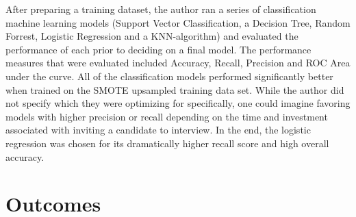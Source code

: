 After preparing a training dataset, the author ran a series of classification machine learning models (Support Vector Classification, a Decision Tree, Random Forrest, Logistic Regression and a KNN-algorithm) and evaluated the performance of each prior to deciding on a final model.  The 
performance measures that were evaluated included Accuracy, Recall, Precision and ROC Area under the curve. All of the classification models performed significantly better when trained on the SMOTE upsampled training data set.  While the author did not specify which they were optimizing for specifically, one could imagine favoring models with higher precision or recall depending on the time and investment associated with inviting a candidate to interview.  In the end, the logistic regression was chosen for its dramatically higher recall score and high overall accuracy.


\pagebreak

\section{Outcomes}

